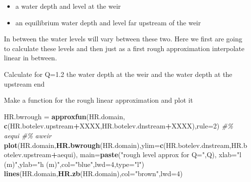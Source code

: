 \documentclass[
]{article}
\newenvironment{Shaded}{\begin{snugshade}}{\end{snugshade}}
\newcommand{\AttributeTok}[1]{\textcolor[rgb]{0.13,0.29,0.53}{#1}}
\newcommand{\CommentTok}[1]{\textcolor[rgb]{0.56,0.35,0.01}{\textit{#1}}}
\newcommand{\ControlFlowTok}[1]{\textcolor[rgb]{0.13,0.29,0.53}{\textbf{#1}}}
\newcommand{\DecValTok}[1]{\textcolor[rgb]{0.00,0.00,0.81}{#1}}
\newcommand{\FloatTok}[1]{\textcolor[rgb]{0.00,0.00,0.81}{#1}}
\newcommand{\FunctionTok}[1]{\textcolor[rgb]{0.13,0.29,0.53}{\textbf{#1}}}
\newcommand{\NormalTok}[1]{#1}
\newcommand{\OtherTok}[1]{\textcolor[rgb]{0.56,0.35,0.01}{#1}}
\newcommand{\SpecialCharTok}[1]{\textcolor[rgb]{0.81,0.36,0.00}{\textbf{#1}}}
\newcommand{\StringTok}[1]{\textcolor[rgb]{0.31,0.60,0.02}{#1}}
\begin{document}
\begin{itemize}
\item
  a water depth and level at the weir
\item
  an equilibrium water depth and level far upstream of the weir
\end{itemize}

In between the water levels will vary between these two. Here we first
are going to calculate these levels and then just as a first rough
approximation interpolate linear in between.

Calculate for Q=1.2 the water depth at the weir and the water depth at
the upstream end

\begin{Shaded}
\end{Shaded}

Make a function for the rough linear approximation and plot it

\begin{Shaded}
\begin{Highlighting}[]
\NormalTok{HR.bwrough }\OtherTok{=} \FunctionTok{approxfun}\NormalTok{(HR.domain,}
                       \FunctionTok{c}\NormalTok{(HR.botelev.upstream}\SpecialCharTok{+}\NormalTok{XXXX,HR.botelev.dnstream}\SpecialCharTok{+}\NormalTok{XXXX),}\AttributeTok{rule=}\DecValTok{2}\NormalTok{) }\CommentTok{\#\% aequi \#\% aweir}
\FunctionTok{plot}\NormalTok{(HR.domain,}\FunctionTok{HR.bwrough}\NormalTok{(HR.domain),}\AttributeTok{ylim=}\FunctionTok{c}\NormalTok{(HR.botelev.dnstream,HR.botelev.upstream}\SpecialCharTok{+}\NormalTok{aequi),}
     \AttributeTok{main=}\FunctionTok{paste}\NormalTok{(}\StringTok{"rough level approx for Q="}\NormalTok{,Q),}
     \AttributeTok{xlab=}\StringTok{"l (m)"}\NormalTok{,}\AttributeTok{ylab=}\StringTok{"h (m)"}\NormalTok{,}\AttributeTok{col=}\StringTok{"blue"}\NormalTok{,}\AttributeTok{lwd=}\DecValTok{4}\NormalTok{,}\AttributeTok{type=}\StringTok{"l"}\NormalTok{)}
\FunctionTok{lines}\NormalTok{(HR.domain,}\FunctionTok{HR.zb}\NormalTok{(HR.domain),}\AttributeTok{col=}\StringTok{"brown"}\NormalTok{,}\AttributeTok{lwd=}\DecValTok{4}\NormalTok{)}
\end{Highlighting}
\end{Shaded}
\end{document}
